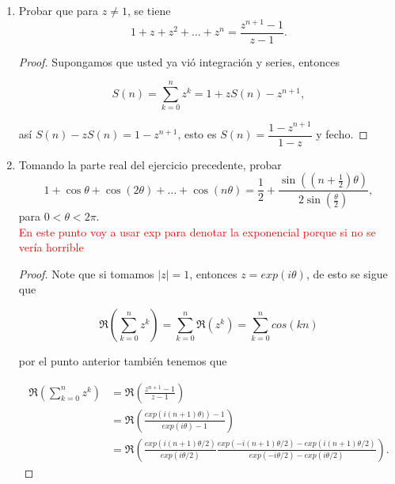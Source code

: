 \documentclass[11pt]{article}
\begin{document}
\begin{enumerate}
    \begin{proof}
    Reemplazando $z$ en las ecuaciones anteriores obtenemos que

    $$\frac{e^{iz}+e^{-iz}}{2}=\Re(e^{iz})=\Re(\cos(z)+i\sin(z))=cos(z)$$

    análogamente $\displaystyle\frac{e^{iz}-e^{-iz}}{2i}=\sin(z)$, luego los ceros coinciden en ambas expreciones \textcolor{red}{depronto estoy  tirando burradas xd}
    \end{proof}

    \item Probar que para $z \neq 1$, se tiene
    \[
    1 + z + z^2 + \dots + z^n = \dfrac{z^{n+1} - 1}{z - 1}.
    \]

    \begin{proof}
    Supongamos que usted ya vió integración y series, entonces

    $$S(n)=\sum_{k=0}^{n} z^k=1+zS(n)-z^{n+1},$$

    así $S(n)-zS(n)=1-z^{n+1}$, esto es $S(n)=\dfrac{1-z^{n+1}}{1-z}$ y fecho. 
    \end{proof}

    \item Tomando la parte real del ejercicio precedente, probar
    \[
    1 + \cos \theta + \cos(2\theta) + \dots + \cos(n\theta) = \frac{1}{2} + \frac{\sin\left((n + \frac{1}{2})\theta\right)}{2 \sin\left(\frac{\theta}{2}\right)},
    \]
    para $0 < \theta < 2\pi$.\\

    \textcolor{red}{En este punto voy a usar exp para denotar la exponencial porque si no se vería horrible}

    \begin{proof}
    Note que si tomamos $|z|=1$, entonces $z=exp(i\theta)$, de esto se sigue que

    $$\Re\left(\sum_{k=0}^{n} z^k\right)=\sum_{k=0}^{n} \Re(z^k)=\sum_{k=0}^{n}cos(kn)$$

    por el punto anterior también tenemos que

    \begin{align*}
      \Re\left(\sum_{k=0}^{n} z^k\right)&=\Re\left(\frac{z^{n+1}-1}{z-1}\right)\\
      &=\Re\left(\frac{exp\left(i(n+1)\theta)\right) -1}{exp(i\theta)-1}\right)\\
      &=\Re\left(\frac{exp(i(n+1)\theta/2)}{exp(i\theta/2)}\frac{exp(-i(n+1)\theta/2)-exp(i(n+1)\theta/2)}{exp(-i\theta/2)-exp(i\theta/2)}\right)
    .\end{align*}


\end{proof}
\end{enumerate}
\end{document}
